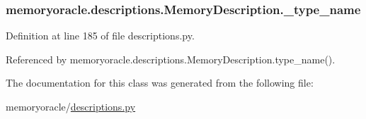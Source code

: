 \subsubsection[{\+\_\+type\+\_\+name}]{\setlength{\rightskip}{0pt plus 5cm}memoryoracle.\+descriptions.\+Memory\+Description.\+\_\+type\+\_\+name\hspace{0.3cm}{\ttfamily [private]}}\label{classmemoryoracle_1_1descriptions_1_1MemoryDescription_a340a0f8c90bf3c2d80323327d706ee1b}


Definition at line 185 of file descriptions.\+py.



Referenced by memoryoracle.\+descriptions.\+Memory\+Description.\+type\+\_\+name().



The documentation for this class was generated from the following file\+:\begin{DoxyCompactItemize}
\item 
memoryoracle/\hyperlink{descriptions_8py}{descriptions.\+py}\end{DoxyCompactItemize}

